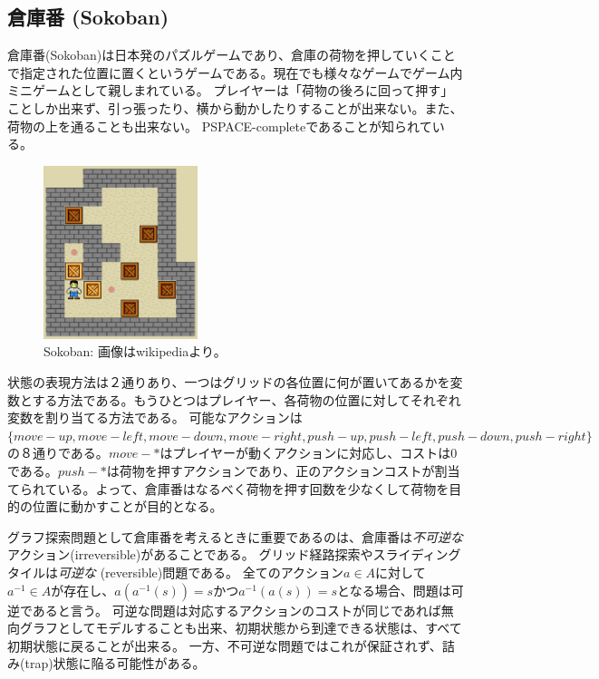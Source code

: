 \documentclass[b5paper]{report}
\begin{document}
\subsection{倉庫番 (Sokoban)}
倉庫番(Sokoban)は日本発のパズルゲームであり、倉庫の荷物を押していくことで指定された位置に置くというゲームである。現在でも様々なゲームでゲーム内ミニゲームとして親しまれている。
プレイヤーは「荷物の後ろに回って押す」ことしか出来ず、引っ張ったり、横から動かしたりすることが出来ない。また、荷物の上を通ることも出来ない。
PSPACE-completeであることが知られている\cite{culberson1997sokoban}。

\begin{figure}
\centering
\includegraphics[bb=0 0 213 238,width=0.4\textwidth]{figures/sokoban.eps}
\caption{Sokoban: 画像はwikipediaより。}
\label{fig:sokoban}
\end{figure}

状態の表現方法は２通りあり、一つはグリッドの各位置に何が置いてあるかを変数とする方法である。もうひとつはプレイヤー、各荷物の位置に対してそれぞれ変数を割り当てる方法である。
可能なアクションは$\{move-up,move-left,move-down,move-right,push-up,push-left,push-down,push-right\}$の８通りである。$move-*$はプレイヤーが動くアクションに対応し、コストは0である。$push-*$は荷物を押すアクションであり、正のアクションコストが割当てられている。よって、倉庫番はなるべく荷物を押す回数を少なくして荷物を目的の位置に動かすことが目的となる。

グラフ探索問題として倉庫番を考えるときに重要であるのは、倉庫番は{\it 不可逆な}アクション(irreversible)があることである。
グリッド経路探索やスライディングタイルは{\it 可逆な} (reversible)問題である。
全てのアクション$a \in A$に対して$a^{-1} \in A$が存在し、$a(a^{-1}(s)) = s$かつ$a^{-1}(a(s)) = s$となる場合、問題は可逆であると言う。
可逆な問題は対応するアクションのコストが同じであれば無向グラフとしてモデルすることも出来、初期状態から到達できる状態は、すべて初期状態に戻ることが出来る。
一方、不可逆な問題ではこれが保証されず、詰み(trap)状態に陥る可能性がある。
\end{document}
